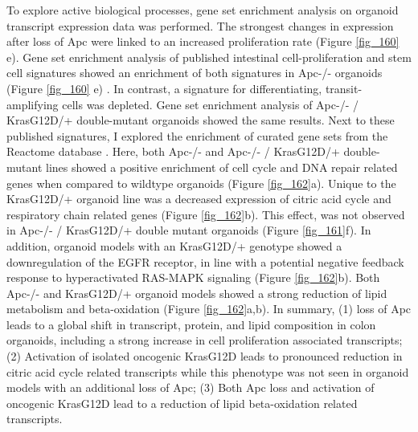 \begin{flushleft}
To explore active biological processes, gene set enrichment analysis on organoid transcript expression data was performed. The strongest changes in expression after loss of Apc were linked to an increased proliferation rate (Figure \ref{fig_160} e). Gene set enrichment analysis of published intestinal cell-proliferation and stem cell signatures showed an enrichment of both signatures in Apc-/- organoids (Figure \ref{fig_160} e) \citep{Merlos-Suarez2011-gd}. In contrast, a signature for differentiating, transit-amplifying cells was depleted. Gene set enrichment analysis of Apc-/- / KrasG12D/+ double-mutant organoids showed the same results. Next to these published signatures, I explored the enrichment of curated gene sets from the Reactome database \citep{Griss2020-qi}. Here, both Apc-/- and Apc-/- / KrasG12D/+ double-mutant lines showed a positive enrichment of cell cycle and DNA repair related genes when compared to wildtype organoids (Figure \ref{fig_162}a). Unique to the KrasG12D/+ organoid line was a decreased expression of citric acid cycle and respiratory chain related genes (Figure \ref{fig_162}b). This effect, was not observed in Apc-/- / KrasG12D/+ double mutant organoids (Figure \ref{fig_161}f). In addition, organoid models with an KrasG12D/+ genotype showed a downregulation of the EGFR receptor, in line with a potential negative feedback response to hyperactivated RAS-MAPK signaling (Figure \ref{fig_162}b). Both Apc-/- and KrasG12D/+ organoid models showed a strong reduction of lipid metabolism and beta-oxidation (Figure \ref{fig_162}a,b). In summary, (1) loss of Apc leads to a global shift in transcript, protein, and lipid composition in colon organoids, including a strong increase in cell proliferation associated transcripts; (2) Activation of isolated oncogenic KrasG12D leads to pronounced reduction in citric acid cycle related transcripts while this phenotype was not seen in organoid models with an additional loss of Apc; (3) Both Apc loss and activation of oncogenic KrasG12D lead to a reduction of lipid beta-oxidation related transcripts.


\end{flushleft}
